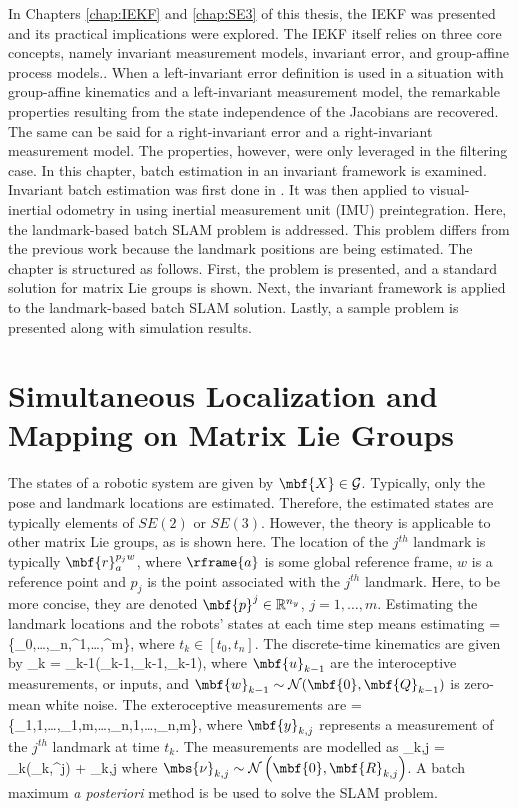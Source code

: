 
In Chapters \ref{chap:IEKF} and \ref{chap:SE3} of this thesis, the IEKF was presented and its practical implications were explored. The IEKF itself relies on three core concepts, namely invariant measurement models, invariant error, and group-affine process models.. When a left-invariant error definition is used in a situation with group-affine kinematics and a left-invariant measurement model, the remarkable properties resulting from the state independence of the Jacobians are recovered. The same can be said for a right-invariant error and a right-invariant measurement model. The properties, however, were only leveraged in the filtering case. In this chapter, batch estimation in an invariant framework is examined. Invariant batch estimation was first done in \cite{Chauchat2018}. It was then applied to visual-inertial odometry in \cite{Hsiung2018} using inertial measurement unit (IMU) preintegration. Here, the landmark-based batch SLAM problem is addressed. This problem differs from the previous work because the landmark positions are being estimated. The chapter is structured as follows. First, the problem is presented, and a standard solution for matrix Lie groups is shown. Next, the invariant framework is applied to the landmark-based batch SLAM solution. Lastly, a sample problem is presented along with simulation results. 

\section{Simultaneous Localization and Mapping on Matrix Lie Groups}
\label{sec:SLAM}

The states of a robotic system are given by $\mbf{X} \in \mathcal{G}$. Typically, only the pose and landmark locations are estimated. Therefore, the estimated states are typically elements of $SE(2)$ or $SE(3)$. However, the theory is applicable to other matrix Lie groups, as is shown here. The location of the $j^{th}$ landmark is typically $\mbf{r}_a^{p_jw}$, where $\rframe{a}$ is some global reference frame, $w$ is a reference point and $p_j$ is the point associated with the $j^{th}$ landmark. Here, to be more concise, they are denoted $\mbf{p}^j \in \mathbb{R}^{n_y}$, $j = 1,\ldots,m$. Estimating the landmark locations and the robots' states at each time step means estimating
\bdis
	 = \left\{_0,\ldots,_n,^1,\ldots,^m\right\},
\edis
where $t_k \in [t_0,t_n]$.
The discrete-time kinematics are given by
\beq
	_k = _{k-1}\left(_{k-1},_{k-1},_{k-1}\right), \label{eq:discrete_process}
\eeq
where $\mbf{u}_{k-1}$ are the interoceptive measurements, or inputs, and $\mbf{w}_{k-1} \sim \mathcal{N}(\mbf{0},\mbf{Q}_{k-1})$ is zero-mean white noise. The exteroceptive measurements are
\bdis
	 = \left\{_{1,1},\ldots,_{1,m},\ldots,_{n,1},\ldots,_{n,m}\right\},
\edis
where $\mbf{y}_{k,j}$ represents a measurement of the $j^{th}$ landmark at time $t_k$.
The measurements are modelled as
\bdis
	_{k,j} = _k\left(_k,^j\right) + \mbs{\nu}_{k,j}
\edis
where $\mbs{\nu}_{k,j} \sim \mathcal{N}\left(\mbf{0},\mbf{R}_{k,j}\right)$. A batch maximum \textit{a posteriori} method is be used to solve the SLAM problem.


